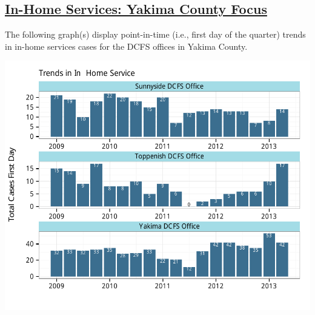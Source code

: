 \documentclass{article}\usepackage[]{graphicx}\usepackage[]{color}
\makeatletter
\def\maxwidth{ %
  \ifdim\Gin@nat@width>\linewidth
    \linewidth
  \else
    \Gin@nat@width
  \fi
}
\newenvironment{knitrout}{}{} %
\makeatother
\begin{document}
\begin{minipage}{\textwidth}
\subsection{\href{http://www.partnersforourchildren.org/child-well-being/visualizations/home-services/trends}
    {In-Home Services: Yakima County Focus}
}
The following graph(s) display point-in-time (i.e., first day of the quarter) trends in in-home services cases for the DCFS offices in Yakima County. 
\nopagebreak[3]
\begin{knitrout}
\color{fgcolor}

{\centering \includegraphics[width=\maxwidth]{figure/ihs_focus} 

}



\end{knitrout}

\end{minipage}

\newpage
\end{document}
